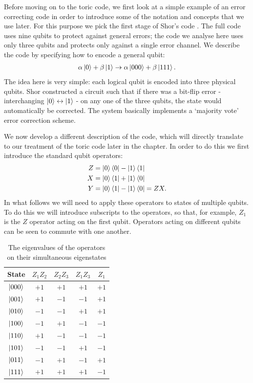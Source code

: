 Before moving on to the toric code, we first look at a simple example of an error correcting code in order to introduce some of the notation and concepts that we use later. For this purpose we pick the first stage of Shor's code \cite{shor_codes_95}. The full code uses nine qubits to protect against general errors; the code we analyse here uses only three qubits and protects only against a single error channel. We describe the code by specifying how to encode a general qubit:
\begin{align}
  \alpha\left\vert0\right\rangle + \beta\left\vert1\right\rangle \rightarrow \alpha\left\vert000\right\rangle + \beta\left\vert111\right\rangle.\label{shor_state}
\end{align}
The idea here is very simple: each logical qubit is encoded into three physical qubits. Shor constructed a circuit such that if there was a bit-flip error - interchanging $\left\vert0\right\rangle \leftrightarrow \left\vert1\right\rangle$ -  on any one of the three qubits, the state would automatically be corrected. The system basically implements a `majority vote' error correction scheme.

We now develop a different description of the code, which will directly translate to our treatment of the toric code later in the chapter. In order to do this we first introduce the standard qubit operators:
\begin{align}
  Z &= \left\vert0\right\rangle\left\langle 0\right\vert - \left\vert1\right\rangle\left\langle 1\right\vert \\
  X &= \left\vert0\right\rangle\left\langle 1\right\vert + \left\vert1\right\rangle\left\langle 0\right\vert \\
  Y &= \left\vert0\right\rangle\left\langle 1\right\vert - \left\vert1\right\rangle\left\langle 0\right\vert = ZX.
\end{align}
In what follows we will need to apply these operators to states of multiple qubits. To do this we will introduce subscripts to the operators, so that, for example, $Z_1$ is the $Z$ operator acting on the first qubit. Operators acting on different qubits can be seen to commute with one another.

\begin{table}
  \begin{center}
    \begin{tabular}{c c c c c}
      State & $Z_1 Z_2$ & $Z_2 Z_3$ & $Z_1 Z_3$ & $Z_1$ \\
      \hline
      $\left\vert000\right\rangle$ & $+1$ & $+1$ & $+1$ & $+1$ \\
      $\left\vert001\right\rangle$ & $+1$ & $-1$ & $-1$ & $+1$ \\
      $\left\vert010\right\rangle$ & $-1$ & $-1$ & $+1$ & $+1$ \\
      $\left\vert100\right\rangle$ & $-1$ & $+1$ & $-1$ & $-1$ \\
      $\left\vert110\right\rangle$ & $+1$ & $-1$ & $-1$ & $-1$ \\
      $\left\vert101\right\rangle$ & $-1$ & $-1$ & $+1$ & $-1$ \\
      $\left\vert011\right\rangle$ & $-1$ & $+1$ & $-1$ & $+1$ \\
      $\left\vert111\right\rangle$ & $+1$ & $+1$ & $+1$ & $-1$
    \end{tabular}
  \end{center}
  \caption{The eigenvalues of the operators on their simultaneous eigenstates}
  \label{shor_states}
\end{table}

